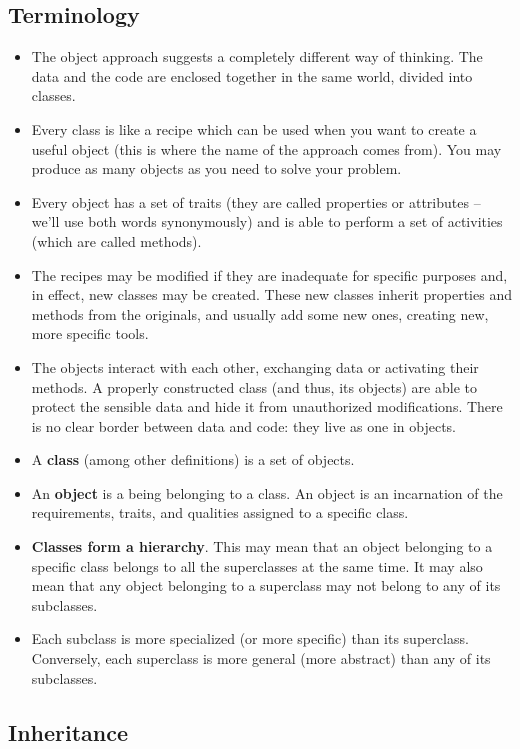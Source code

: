 \documentclass[11pt]{article}
\begin{document}
\subsection{Terminology}
\label{sec:orgc865cec}
\begin{itemize}
\item The object approach suggests a completely different way of
thinking. The data and the code are enclosed together in the same
world, divided into classes.
\item Every class is like a recipe which can be used when you want to
create a useful object (this is where the name of the approach comes
from). You may produce as many objects as you need to solve your
problem.
\item Every object has a set of traits (they are called properties or
attributes – we’ll use both words synonymously) and is able to
perform a set of activities (which are called methods).
\item The recipes may be modified if they are inadequate for specific
purposes and, in effect, new classes may be created. These new
classes inherit properties and methods from the originals, and
usually add some new ones, creating new, more specific tools.
\item The objects interact with each other, exchanging data or activating
their methods. A properly constructed class (and thus, its objects)
are able to protect the sensible data and hide it from unauthorized
modifications. There is no clear border between data and code: they
live as one in objects.
\item A \textbf{class} (among other definitions) is a set of objects.
\item An \textbf{object} is a being belonging to a class. An object is an
incarnation of the requirements, traits, and qualities assigned to a
specific class.
\item \textbf{Classes form a hierarchy}. This may mean that an object belonging to
a specific class belongs to all the superclasses at the same
time. It may also mean that any object belonging to a superclass may
not belong to any of its subclasses.
\item Each subclass is more specialized (or more specific) than its
superclass. Conversely, each superclass is more general (more
abstract) than any of its subclasses.
\end{itemize}

\newpage

\subsection{Inheritance}
\label{sec:orgb22c8ae}
\end{document}
